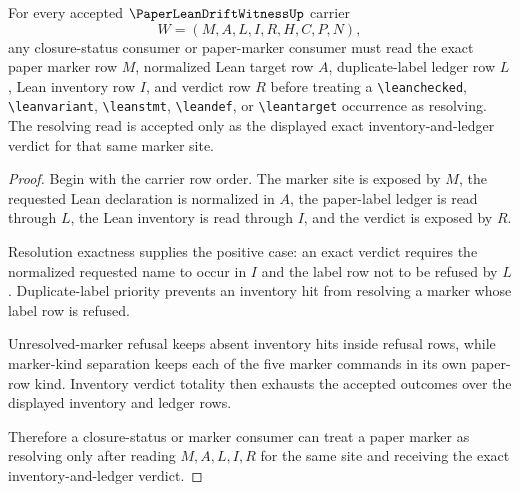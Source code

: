 \begin{theorem}
\label{thm:paper-lean-drift-witness-closure-target-resolution}
For every accepted $\PaperLeanDriftWitnessUp$ carrier
$$
W=(M,A,L,I,R,H,C,P,N),
$$
any closure-status consumer or paper-marker consumer must read the exact paper marker row $M$, normalized Lean target row $A$, duplicate-label ledger row $L$, Lean inventory row $I$, and verdict row $R$ before treating a \texttt{\textbackslash leanchecked}, \texttt{\textbackslash leanvariant}, \texttt{\textbackslash leanstmt}, \texttt{\textbackslash leandef}, or \texttt{\textbackslash leantarget} occurrence as resolving. The resolving read is accepted only as the displayed exact inventory-and-ledger verdict for that same marker site.
\end{theorem}
\begin{proof}
Begin with the carrier row order. The marker site is exposed by $M$, the requested Lean declaration is normalized in $A$, the paper-label ledger is read through $L$, the Lean inventory is read through $I$, and the verdict is exposed by $R$.

Resolution exactness supplies the positive case: an exact verdict requires the normalized requested name to occur in $I$ and the label row not to be refused by $L$. Duplicate-label priority prevents an inventory hit from resolving a marker whose label row is refused.

Unresolved-marker refusal keeps absent inventory hits inside refusal rows, while marker-kind separation keeps each of the five marker commands in its own paper-row kind. Inventory verdict totality then exhausts the accepted outcomes over the displayed inventory and ledger rows.

Therefore a closure-status or marker consumer can treat a paper marker as resolving only after reading $M,A,L,I,R$ for the same site and receiving the exact inventory-and-ledger verdict.
\end{proof}

